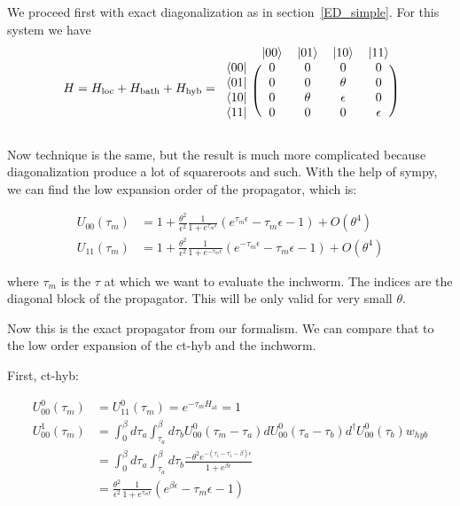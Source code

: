 \documentclass[10pt,letter]{article}
\begin{document}
We proceed first with exact diagonalization as in section~\ref{ED_simple}. For this system we have
\begin{align}
H=
H_\text{loc} + H_\text{bath} + H_\text{hyb}=
\begin{blockarray}{ccccc}
& \ket{00} & \ket{01} & \ket{10} & \ket{11} \\
\begin{block}{c(cccc)}
\bra{00} & 0&0&0&0\\
\bra{01} & 0&0&\theta&0\\
\bra{10} & 0&\theta&\epsilon&0\\
\bra{11} & 0&0&0&\epsilon\\
\end{block}
\end{blockarray}
\end{align}

Now technique is the same, but the result is much more complicated because diagonalization produce a lot of squareroots and such. With the help of sympy, we can find the low expansion order of the propagator, which is:

\begin{align}
  U_{00}(\tau_{m}) 
  &= 1+ \frac{\theta^2}{\epsilon^2} 
  \frac{1}{1+e^{\tau_{m}\epsilon}}
  ( e^{\tau_{m}\epsilon} -\tau_{m}\epsilon - 1)
  + O(\theta^4)
  \\
  U_{11}(\tau_{m}) 
  &= 1+ \frac{\theta^2}{\epsilon^2} 
  \frac{1}{1+e^{-\tau_{m}\epsilon}}
  ( e^{-\tau_{m}\epsilon} -\tau_{m}\epsilon - 1)
  + O(\theta^4)
\end{align}

where $\tau_{m}$ is the $\tau$ at which we want to evaluate the inchworm. The indices are the diagonal block of the propagator. This will be only valid for very small $\theta$.

Now this is the exact propagator from our formalism. We can compare that to the low order expansion of the ct-hyb and the inchworm.

First, ct-hyb:

\begin{align}
  U^0_{00}(\tau_{m}) &= U^0_{11}(\tau_{m}) = e^{-\tau_{m} H_{\mathrm{at}}} = 1
  \\
  U^1_{00}(\tau_{m}) &= 
  \int_{0}^{\beta} d \tau_a 
  \int_{\tau_a}^{\beta} d \tau_b
  U^0_{00}(\tau_m-\tau_a) d 
  U^0_{00}(\tau_a-\tau_b) d^\dag
  U^0_{00}(\tau_b)
  w_{hyb}
  \\
  &= \int_{0}^{\beta} d \tau_a 
     \int_{\tau_a}^{\beta} d \tau_b
     \frac{-\theta^2 e^{-(\tau_1-\tau_1^\prime-\beta)\epsilon}}{1+e^{\beta\epsilon} }
  \\ 
  &= \frac{\theta^2}{\epsilon^2} 
  \frac{1}{1+e^{\tau_m\epsilon}}
  ( e^{\beta \epsilon} -\tau_m\epsilon - 1)
\end{align}
\end{document}
